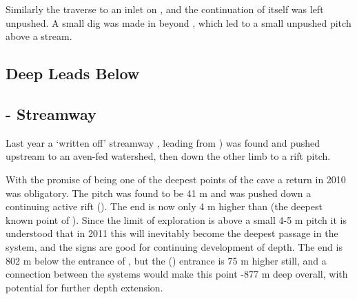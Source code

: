Similarly the traverse to an inlet on , and the continuation of  itself was left unpushed. A small dig was made in  beyond , which led to a small unpushed pitch above a stream.

\subsection{Deep Leads Below }

\subsection{ - 
Streamway}

Last year a `written off' streamway , leading from
) was found and pushed upstream to an aven-fed watershed, then down the other limb to a rift pitch.

With the promise of being one of the deepest points of the cave a return in 2010 was obligatory. The pitch was found to be 41 m and was pushed down a continuing active rift (). The end is now only 4 m higher than  (the deepest known point of ).
Since the limit of exploration is above a small 4-5 m pitch it is understood that in 2011 this will inevitably become the deepest passage
in the system, and the signs are good for continuing development of depth. The end is 802 m below the entrance of , but the
 () entrance is 75 m higher still, and a connection between the systems would make this point -877 m deep overall, with
potential for further depth extension.

